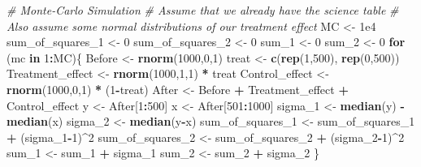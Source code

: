 \documentclass[]{article}
\newenvironment{Shaded}{\begin{snugshade}}{\end{snugshade}}
\newcommand{\KeywordTok}[1]{\textcolor[rgb]{0.13,0.29,0.53}{\textbf{#1}}}
\newcommand{\DecValTok}[1]{\textcolor[rgb]{0.00,0.00,0.81}{#1}}
\newcommand{\FloatTok}[1]{\textcolor[rgb]{0.00,0.00,0.81}{#1}}
\newcommand{\StringTok}[1]{\textcolor[rgb]{0.31,0.60,0.02}{#1}}
\newcommand{\CommentTok}[1]{\textcolor[rgb]{0.56,0.35,0.01}{\textit{#1}}}
\newcommand{\ControlFlowTok}[1]{\textcolor[rgb]{0.13,0.29,0.53}{\textbf{#1}}}
\newcommand{\OperatorTok}[1]{\textcolor[rgb]{0.81,0.36,0.00}{\textbf{#1}}}
\newcommand{\NormalTok}[1]{#1}
\begin{document}
\begin{Shaded}
\begin{Highlighting}[]
\CommentTok{# Monte-Carlo Simulation}
\CommentTok{# Assume that we already have the science table}
\CommentTok{# Also assume some normal distributions of our treatment effect}
\NormalTok{MC <-}\StringTok{ }\FloatTok{1e4}
\NormalTok{sum_of_squares_}\DecValTok{1}\NormalTok{ <-}\StringTok{ }\DecValTok{0}
\NormalTok{sum_of_squares_}\DecValTok{2}\NormalTok{ <-}\StringTok{ }\DecValTok{0}
\NormalTok{sum_}\DecValTok{1}\NormalTok{ <-}\StringTok{ }\DecValTok{0}
\NormalTok{sum_}\DecValTok{2}\NormalTok{ <-}\StringTok{ }\DecValTok{0}
\ControlFlowTok{for}\NormalTok{ (mc }\ControlFlowTok{in} \DecValTok{1}\OperatorTok{:}\NormalTok{MC)\{}
\NormalTok{  Before <-}\StringTok{ }\KeywordTok{rnorm}\NormalTok{(}\DecValTok{1000}\NormalTok{,}\DecValTok{0}\NormalTok{,}\DecValTok{1}\NormalTok{)}
\NormalTok{  treat <-}\StringTok{ }\KeywordTok{c}\NormalTok{(}\KeywordTok{rep}\NormalTok{(}\DecValTok{1}\NormalTok{,}\DecValTok{500}\NormalTok{), }\KeywordTok{rep}\NormalTok{(}\DecValTok{0}\NormalTok{,}\DecValTok{500}\NormalTok{))}
\NormalTok{  Treatment_effect <-}\StringTok{ }\KeywordTok{rnorm}\NormalTok{(}\DecValTok{1000}\NormalTok{,}\DecValTok{1}\NormalTok{,}\DecValTok{1}\NormalTok{) }\OperatorTok{*}\StringTok{ }\NormalTok{treat}
\NormalTok{  Control_effect <-}\StringTok{ }\KeywordTok{rnorm}\NormalTok{(}\DecValTok{1000}\NormalTok{,}\DecValTok{0}\NormalTok{,}\DecValTok{1}\NormalTok{) }\OperatorTok{*}\StringTok{ }\NormalTok{(}\DecValTok{1}\OperatorTok{-}\NormalTok{treat)}
\NormalTok{  After <-}\StringTok{ }\NormalTok{Before }\OperatorTok{+}\StringTok{ }\NormalTok{Treatment_effect }\OperatorTok{+}\StringTok{ }\NormalTok{Control_effect}
\NormalTok{  y <-}\StringTok{ }\NormalTok{After[}\DecValTok{1}\OperatorTok{:}\DecValTok{500}\NormalTok{]}
\NormalTok{  x <-}\StringTok{ }\NormalTok{After[}\DecValTok{501}\OperatorTok{:}\DecValTok{1000}\NormalTok{]}
\NormalTok{  sigma_}\DecValTok{1}\NormalTok{ <-}\StringTok{ }\KeywordTok{median}\NormalTok{(y) }\OperatorTok{-}\StringTok{ }\KeywordTok{median}\NormalTok{(x)}
\NormalTok{  sigma_}\DecValTok{2}\NormalTok{ <-}\StringTok{ }\KeywordTok{median}\NormalTok{(y}\OperatorTok{-}\NormalTok{x)}
\NormalTok{  sum_of_squares_}\DecValTok{1}\NormalTok{ <-}\StringTok{ }\NormalTok{sum_of_squares_}\DecValTok{1} \OperatorTok{+}\StringTok{ }\NormalTok{(sigma_}\DecValTok{1}\OperatorTok{-}\DecValTok{1}\NormalTok{)}\OperatorTok{^}\DecValTok{2}
\NormalTok{  sum_of_squares_}\DecValTok{2}\NormalTok{ <-}\StringTok{ }\NormalTok{sum_of_squares_}\DecValTok{2} \OperatorTok{+}\StringTok{ }\NormalTok{(sigma_}\DecValTok{2}\OperatorTok{-}\DecValTok{1}\NormalTok{)}\OperatorTok{^}\DecValTok{2}
\NormalTok{  sum_}\DecValTok{1}\NormalTok{ <-}\StringTok{ }\NormalTok{sum_}\DecValTok{1} \OperatorTok{+}\StringTok{ }\NormalTok{sigma_}\DecValTok{1}
\NormalTok{  sum_}\DecValTok{2}\NormalTok{ <-}\StringTok{ }\NormalTok{sum_}\DecValTok{2} \OperatorTok{+}\StringTok{ }\NormalTok{sigma_}\DecValTok{2}
\NormalTok{\}}
\end{Highlighting}
\end{Shaded}
\end{document}
